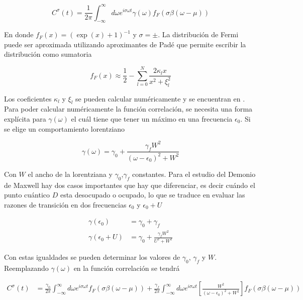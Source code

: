 \begin{appendixs}
\begin{equation*}
    C^{\sigma}(t) = \frac{1}{2\pi} \int_{-\infty}^{\infty} d\omega e^{i\sigma \omega t} \gamma(\omega) f_{F}(\sigma \beta(\omega-\mu))
\end{equation*}

En donde $f_{F}(x) = (\exp(x)+1)^{-1}$ y $\sigma = \pm$. La distribución de Fermi puede ser aproximada utilizando aproximantes de Padé \cite{hu2011pade,schinabeck2019hierarchical} que permite escribir la distribución como sumatoria

\begin{equation}
    f_{F}(x) \approx \frac{1}{2} - \sum_{l=0}^{N} \frac{ 2 \kappa_{l}x }{ x^{2} + \xi^{2}_{l} }
    \label{apendix5:pade}
\end{equation}

Los coeficientes $\kappa_{l}$ y $\xi_{l}$ se pueden calcular numéricamente y se encuentran en \cite{hu2011pade}. Para poder calcular numéricamente la función correlación, se necesita una forma explícita para $\gamma(\omega)$ el cuál tiene que tener un máximo en una frecuencia $\epsilon_{0}$. Si se elige un comportamiento lorentziano


\begin{equation*}
    \gamma(\omega) = \gamma_{0} + \frac{\gamma_{f} W^{2}}{(\omega - \epsilon_{0})^{2} + W^{2}}
\end{equation*}

Con $W$ el ancho de la lorentziana y $\gamma_{0}$,$\gamma_{f}$ constantes. Para el estudio del Demonio de Maxwell hay dos casos importantes que hay que diferenciar, es decir cuándo el punto cuántico $D$ esta desocupado o ocupado, lo que se traduce en evaluar las razones de transición en dos frecuencias $\epsilon_{0}$ y $\epsilon_{0}+U$

\begin{align*}
    \gamma(\epsilon_{0}) & = \gamma_{0} + \gamma_{f} \\
    \gamma(\epsilon_{0} + U) & = \gamma_{0} + \frac{\gamma_{f} W^{2} }{U^{2} + W^{2}}
\end{align*}

Con estas igualdades se pueden determinar los valores de $\gamma_{0}$, $\gamma_{f}$ y $W$. Reemplazando $\gamma(\omega)$ en la función correlación se tendrá

\begin{align*}
    C^{\sigma}(t) & = \frac{\gamma_{0}}{2\pi} \int_{-\infty}^{\infty}d\omega e^{i\sigma \omega t} f_{F}(\sigma \beta (\omega-\mu)) + \frac{\gamma_{f}}{2\pi} \int_{-\infty}^{\infty}d\omega e^{i\sigma \omega t}\left[ \frac{W^{2}}{(\omega-\epsilon_{0})^{2} + W^{2}} \right] f_{F}(\sigma \beta (\omega-\mu))
\end{align*}


\end{appendixs}
